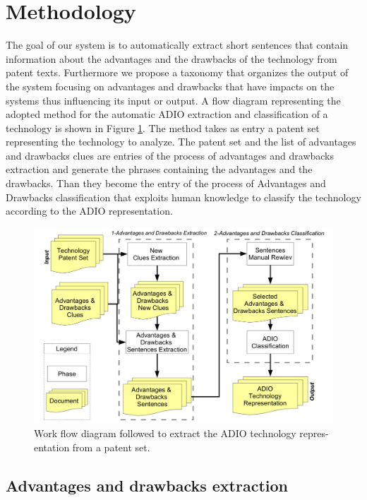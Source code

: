 \documentclass[]{book}
\begin{document}
\section{Methodology}\label{methodology-9}

The goal of our system is to automatically extract short sentences that
contain information about the advantages and the drawbacks of the
technology from patent texts. Furthermore we propose a taxonomy that
organizes the output of the system focusing on advantages and drawbacks
that have impacts on the systems thus influencing its input or output. A
flow diagram representing the adopted method for the automatic ADIO
extraction and classification of a technology is shown in Figure
\ref{fig:adioworkflow}. The method takes as entry a patent set
representing the technology to analyze. The patent set and the list of
advantages and drawbacks clues are entries of the process of advantages
and drawbacks extraction and generate the phrases containing the
advantages and the drawbacks. Than they become the entry of the process
of Advantages and Drawbacks classification that exploits human knowledge
to classify the technology according to the ADIO representation.

\begin{figure}

{\centering \includegraphics[width=0.8\linewidth]{_bookdown_files/figures/adioworkflow} 

}

\caption{Work flow diagram followed to extract the ADIO technology repres- entation from a patent set.}\label{fig:adioworkflow}
\end{figure}

\subsection{Advantages and drawbacks
extraction}\label{advantages-and-drawbacks-extraction}
\end{document}
